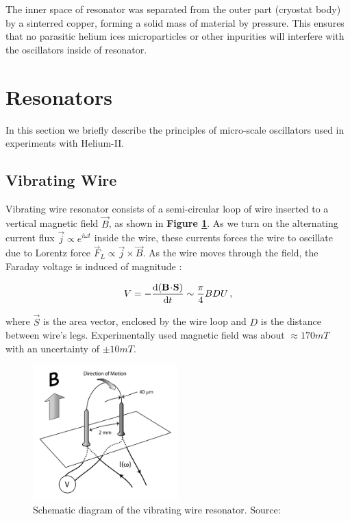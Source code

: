 The inner space of resonator was separated from the outer part (cryostat body) by a sinterred copper, forming a solid mass of material by pressure. This ensures that no parasitic helium ices microparticles or other inpurities will interfere with the oscillators inside of resonator.


\newpage

\section{Resonators}

In this section we briefly describe the principles of micro-scale oscillators used in experiments with Helium-II.

\subsection*{Vibrating Wire}

Vibrating wire resonator consists of a semi-circular loop of wire inserted to a vertical magnetic field $\vec{B}$, as shown in \textbf{Figure \ref{wire}}. As we turn on the alternating current flux $\vec{j} \propto e^{i\omega t}$ inside the wire, these currents forces the wire to oscillate due to Lorentz force $\vec{F}_L \propto \vec{j} \times \vec{B} $. As the wire moves through the field, the Faraday voltage is induced of magnitude \cite{wire}:

\begin{equation}
V = - \frac{\text{d} (\mathbf{B} \!\cdot\! \mathbf{S})}{\text{d} t}
\sim \frac{\pi}{4} BDU\,,
\end{equation}

where $\vec{S}$ is the area vector, enclosed by the wire loop and $D$ is the distance between wire's legs. Experimentally used magnetic field was about $\approx 170 \unit{mT}$ with an uncertainty of $\pm 10 \unit{mT}$.

\begin{figure}[h]
	\centering
	\includegraphics[width=0.5\textwidth]{graphics/exp/wire}
	\caption{Schematic diagram of the vibrating wire resonator. Source: \cite{universal_scaling}}
	\label{wire}
\end{figure}

